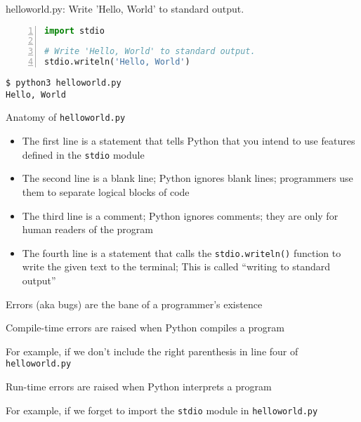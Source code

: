 \documentclass[8pt,a4paper,compress]{beamer}
\begin{document}
\begin{frame}[fragile]
\pause

\begin{framed}
\tiny helloworld.py: Write 'Hello, World' to standard output.
\end{framed}

\begin{lstlisting}[language=Python,numbers=left,style=focusin]
import stdio

# Write 'Hello, World' to standard output.
stdio.writeln('Hello, World')
\end{lstlisting}

\pause\bigskip

\begin{lstlisting}[language={},style=focusin]
$ python3 helloworld.py 
Hello, World
\end{lstlisting}

\pause\bigskip

Anatomy of \lstinline{helloworld.py}
\begin{itemize}
\pause
\item The first line is a statement that tells Python that you intend to use features defined in the \lstinline{stdio} module
 
\pause
\item The second line is a blank line; Python ignores blank lines; programmers use them to separate logical blocks of code

\pause
\item The third line is a comment; Python ignores comments; they are only for human readers of the program

\pause
\item The fourth line is a statement that calls the \lstinline{stdio.writeln()} function to write the given text to the terminal; This is called ``writing to standard output''
\end{itemize}
\end{frame}

\begin{frame}[fragile]
\pause

Errors (aka bugs) are the bane of a programmer's existence

\pause
\bigskip

Compile-time errors are raised when Python compiles a program

\pause
\bigskip

For example, if we don't include the right parenthesis in line four of \lstinline{helloworld.py}

\pause
\bigskip

Run-time errors are raised when Python interprets a program

\pause
\bigskip

For example, if we forget to import the \lstinline{stdio} module in \lstinline{helloworld.py}
\end{frame}
\end{document}
